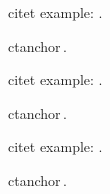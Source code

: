 \documentclass{article}
\begin{document}
citet example: \citet{Test:Book,Test:Inproceedings,Test:Article}.


ctanchor\,\citep{Test:Book,Test:Inproceedings,Test:Article}.


citet example: \citet{Test:Book}.


ctanchor\,\citep{Test:Book}.


citet example: \citet{Test:Book,Test:Inproceedings}.


ctanchor\,\citep{Test:Inproceedings,Test:Article}.




\end{document}

